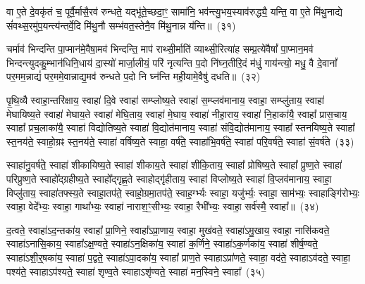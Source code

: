वा ए॒ते दे॒वकृ॑तं च॒ पूर्वै॒र्मासै॒रव॑ रुन्धते॒ यद्भू॑ते॒च्छदा॒ꣳ॒ सामा॑नि॒ भव॑न्त्यु॒भय॒स्याव॑रुद्ध्यै॒ यन्ति॒ वा ए॒ते मि॑थु॒नाद्ये सं॑वथ्स॒रमु॑प॒यन्त्य॑न्तर्वे॒दि मि॑थु॒नौ सम्भ॑वत॒स्तेनै॒व मि॑थु॒नान्न य॑न्ति॥~(३१)

{\anuvakamend[{व्यृ॑द्ध॒मक्षो॑धुका॒स्ताꣳ समां᳚ प्र॒जाः प॑र॒मामे॒व च॑ त्रि॒ꣳ॒शच्च॑}]}%

चर्माव॑ भिन्दन्ति पा॒प्मान॑मे॒वैषा॒मव॑ भिन्दन्ति॒ माप॑ राथ्सी॒र्माति॑ व्याथ्सी॒रित्या॑ह सम्प्र॒त्ये॑वैषां᳚ पा॒प्मान॒मव॑ भिन्दन्त्युदकु॒म्भान॑धिनि॒धाय॑ दा॒स्यो॑ मार्जा॒लीयं॒ परि॑ नृत्यन्ति प॒दो नि॑घ्न॒तीरि॒दं म॑धुं॒ गाय॑न्त्यो॒ मधु॒ वै दे॒वानां᳚ पर॒मम॒न्नाद्यं॑ पर॒ममे॒वान्नाद्य॒मव॑ रुन्धते प॒दो नि घ्न॑न्ति मही॒यामे॒वैषु॑ दधति॥~(३२)

{\anuvakamend[{चर्मैका॒न्नप॑ञ्चा॒शत्}]}%

पृ॒थि॒व्यै स्वाहा॒न्तरि॑क्षाय॒ स्वाहा॑ दि॒वे स्वाहा॑ सम्प्लोष्य॒ते स्वाहा॑ स॒म्प्लव॑मानाय॒ स्वाहा॒ सम्प्लु॑ताय॒ स्वाहा॑ मेघायिष्य॒ते स्वाहा॑ मेघाय॒ते स्वाहा॑ मेघि॒ताय॒ स्वाहा॑ मे॒घाय॒ स्वाहा॑ नीहा॒राय॒ स्वाहा॑ नि॒हाका॑यै॒ स्वाहा᳚ प्रास॒चाय॒ स्वाहा᳚ प्रच॒लाका॑यै॒ स्वाहा॑ विद्योतिष्य॒ते स्वाहा॑ वि॒द्योत॑मानाय॒ स्वाहा॑ संवि॒द्योत॑मानाय॒ स्वाहा᳚ स्तनयिष्य॒ते स्वाहा᳚ स्त॒नय॑ते॒ स्वाहो॒ग्रꣴ स्त॒नय॑ते॒ स्वाहा॑ वर्\mbox{}षिष्य॒ते स्वाहा॒ वर्\mbox{}ष॑ते॒ स्वाहा॑भि॒वर्\mbox{}ष॑ते॒ स्वाहा॑ परि॒वर्\mbox{}ष॑ते॒ स्वाहा॑ सं॒वर्\mbox{}ष॑ते~(३३)

स्वाहा॑नु॒वर्\mbox{}ष॑ते॒ स्वाहा॑ शीकायिष्य॒ते स्वाहा॑ शीकाय॒ते स्वाहा॑ शीकि॒ताय॒ स्वाहा᳚ प्रोषिष्य॒ते स्वाहा᳚ प्रुष्ण॒ते स्वाहा॑ परिप्रुष्ण॒ते स्वाहो᳚द्ग्रहीष्य॒ते स्वाहो᳚द्गृह्ण॒ते स्वाहोद्गृ॑हीताय॒ स्वाहा॑ विप्लोष्य॒ते स्वाहा॑ वि॒प्लव॑मानाय॒ स्वाहा॒ विप्लु॑ताय॒ स्वाहा॑तफ्स्य॒ते स्वाहा॒तप॑ते॒ स्वाहो॒ग्रमा॒तप॑ते॒ स्वाह॒र्ग्भ्यः स्वाहा॒ यजु॑र्भ्यः॒ स्वाहा॒ साम॑भ्यः॒ स्वाहाङ्गि॑रोभ्यः॒ स्वाहा॒ वेदे᳚भ्यः॒ स्वाहा॒ गाथा᳚भ्यः॒ स्वाहा॑ नाराश॒ꣳ॒सीभ्यः॒ स्वाहा॒ रैभी᳚भ्यः॒ स्वाहा॒ सर्व॑स्मै॒ स्वाहा᳚॥~(३४)

{\anuvakamend[{सं॒ वर्\mbox{}ष॑ते॒ रैभी᳚भ्यः॒ स्वाहा॒ द्वे च॑}]}%

द॒त्वते॒ स्वाहा॑\-ऽद॒न्तका॑य॒ स्वाहा᳚ प्रा॒णिने॒ स्वाहा᳚\-ऽप्रा॒णाय॒ स्वाहा॒ मुख॑वते॒ स्वाहा॑\-ऽमु॒खाय॒ स्वाहा॒ नासि॑कवते॒ स्वाहा॑\-ऽनासि॒काय॒ स्वाहा᳚\-ऽक्ष॒ण्वते॒ स्वाहा॑\-ऽन॒क्षिका॑य॒ स्वाहा॑ क॒र्णिने॒ स्वाहा॑\-ऽक॒र्णका॑य॒ स्वाहा॑ शीर्\mbox{}ष॒ण्वते॒ स्वाहा॑\-ऽ\-शी॒र्॒\mbox{}षका॑य॒ स्वाहा॑ प॒द्वते॒ स्वाहा॑\-ऽपा॒दका॑य॒ स्वाहा᳚ प्राण॒ते स्वाहा\-ऽप्रा॑णते॒ स्वाहा॒ वद॑ते॒ स्वाहा\-ऽव॑दते॒ स्वाहा॒ पश्य॑ते॒ स्वाहा\-ऽप॑श्यते॒ स्वाहा॑ शृण्व॒ते स्वाहा\-ऽशृ॑ण्वते॒ स्वाहा॑ मन॒स्विने॒ स्वाहा᳚~(३५)

